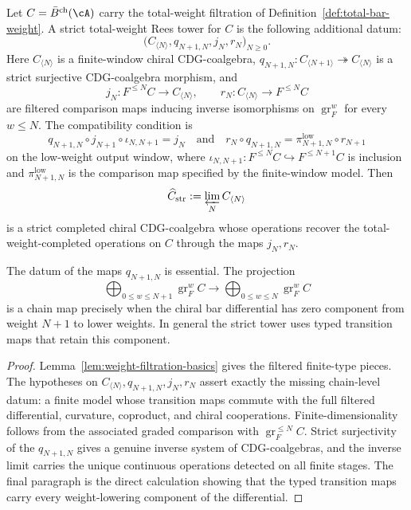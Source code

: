 \begin{lemma}
\label{lem:total-weight-rees-finite-cdg-tower}
Let $C=\bar B^{\mathrm{ch}}(\cA)$ carry the total-weight filtration
of Definition~\ref{def:total-bar-weight}.  A strict total-weight
Rees tower for $C$ is the following additional datum:
\[
\bigl(C_{\langle N\rangle},q_{N+1,N},j_N,r_N\bigr)_{N\geq0}.
\]
Here $C_{\langle N\rangle}$ is a finite-window chiral
CDG-coalgebra, $q_{N+1,N}\colon C_{\langle N+1\rangle}\twoheadrightarrow
C_{\langle N\rangle}$ is a strict surjective CDG-coalgebra morphism,
and
\[
j_N\colon F^{\leq N}C\longrightarrow C_{\langle N\rangle},
\qquad
r_N\colon C_{\langle N\rangle}\longrightarrow F^{\leq N}C
\]
are filtered comparison maps inducing inverse isomorphisms on
$\operatorname{gr}^w_F$ for every $w\leq N$. The compatibility
condition is
\[
q_{N+1,N}\circ j_{N+1}\circ \iota_{N,N+1}
=
j_N
\quad\text{and}\quad
r_N\circ q_{N+1,N}
=
\pi^{\mathrm{low}}_{N+1,N}\circ r_{N+1}
\]
on the low-weight output window, where
$\iota_{N,N+1}\colon F^{\leq N}C\hookrightarrow F^{\leq N+1}C$ is
inclusion and $\pi^{\mathrm{low}}_{N+1,N}$ is the comparison map
specified by the finite-window model. Then
\[
\widehat C_{\mathrm{str}}
:=\varprojlim_N C_{\langle N\rangle}
\]
is a strict completed chiral CDG-coalgebra whose operations recover
the total-weight-completed operations on $C$ through the maps
$j_N,r_N$.

The datum of the maps $q_{N+1,N}$ is essential.  The projection
\[
\bigoplus_{0\leq w\leq N+1}\operatorname{gr}^w_F C
\longrightarrow
\bigoplus_{0\leq w\leq N}\operatorname{gr}^w_F C
\]
is a chain map precisely when the chiral bar differential has zero
component from weight \(N+1\) to lower weights.  In general the strict
tower uses typed transition maps that retain this component.
\end{lemma}

\begin{proof}
Lemma~\ref{lem:weight-filtration-basics} gives the filtered
finite-type pieces.  The hypotheses on
$C_{\langle N\rangle},q_{N+1,N},j_N,r_N$ assert exactly the missing
chain-level datum: a finite model whose transition maps commute with
the full filtered differential, curvature, coproduct, and chiral
cooperations.  Finite-dimensionality follows from the associated
graded comparison with $\operatorname{gr}^{\leq N}_F C$.  Strict
surjectivity of the $q_{N+1,N}$ gives a genuine inverse system of
CDG-coalgebras, and the inverse limit carries the unique continuous
operations detected on all finite stages.  The final paragraph is the
direct calculation showing that the typed transition maps carry every
weight-lowering component of the differential.
\end{proof}

